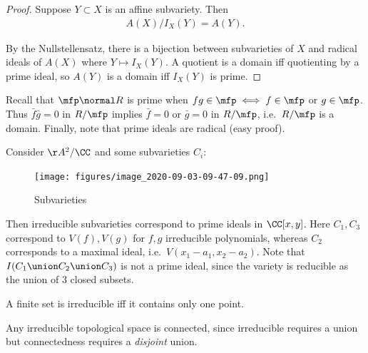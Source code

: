 \begin{proof}

Suppose \(Y\subset X\) is an affine subvariety. Then
\begin{align*}  
A(X) / I_X(Y) = A(Y)
.\end{align*}

By the Nullstellensatz, there is a bijection between subvarieties of
\(X\) and radical ideals of \(A(X)\) where \(Y\mapsto I_X(Y)\). A
quotient is a domain iff quotienting by a prime ideal, so \(A(Y)\) is a
domain iff \(I_X(Y)\) is prime.

\end{proof}

Recall that \(\mfp \normal R\) is prime when
\(fg\in \mfp \iff f\in \mfp\) or \(g\in \mfp\). Thus
\(\bar f \bar g = 0\) in \(R/\mfp\) implies \(\bar f = 0\) or
\(\bar g = 0\) in \(R/\mfp\), i.e.~\(R/\mfp\) is a domain. Finally, note
that prime ideals are radical (easy proof).

\begin{example}

Consider \(\AA^2/\CC\) and some subvarieties \(C_i\):

\begin{figure}
\centering
\texttt{[image: figures/image\_2020-09-03-09-47-09.png]}
\caption{Subvarieties}
\end{figure}

Then irreducible subvarieties correspond to prime ideals in
\(\CC[x, y]\). Here \(C_1, C_3\) correspond to \(V(f), V(g)\) for
\(f,g\) irreducible polynomials, whereas \(C_2\) corresponds to a
maximal ideal, i.e.~\(V(x_1 - a_1, x_2 - a_2)\). Note that
\(I(C_1 \union C_2 \union C_3)\) is not a prime ideal, since the variety
is reducible as the union of 3 closed subsets.

\end{example}

\begin{example}

A finite set is irreducible iff it contains only one point.

\end{example}

\begin{example}

Any irreducible topological space is connected, since irreducible
requires a union but connectedness requires a \emph{disjoint} union.

\end{example}


